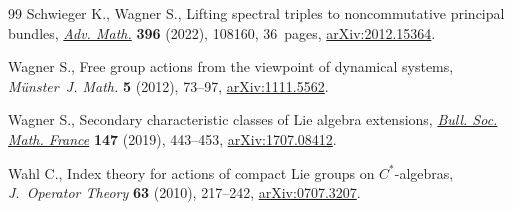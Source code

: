 \documentclass[10pt,a4paper]{amsart}
\numberwithin{equation}{section}
\begin{document}
\begin{thebibliography}{99}
Schwieger K., Wagner S., Lifting spectral triples to noncommutative principal
 bundles, \href{https://doi.org/10.1016/j.aim.2021.108160}{\textit{Adv. Math.}} \textbf{396} (2022), 108160, 36~pages,
 \href{https://arxiv.org/abs/2012.15364}{arXiv:2012.15364}.

Wagner S., Free group actions from the viewpoint of dynamical systems,
 \textit{M\"unster~J. Math.} \textbf{5} (2012), 73--97, \href{https://arxiv.org/abs/1111.5562}{arXiv:1111.5562}.

Wagner S., Secondary characteristic classes of {L}ie algebra extensions,
 \href{https://doi.org/10.24033/bsmf.278}{\textit{Bull. Soc. Math. France}} \textbf{147} (2019), 443--453,
 \href{https://arxiv.org/abs/1707.08412}{arXiv:1707.08412}.

Wahl C., Index theory for actions of compact {L}ie groups on {$C^*$}-algebras,
 \textit{J.~Operator Theory} \textbf{63} (2010), 217--242, \href{https://arxiv.org/abs/0707.3207}{arXiv:0707.3207}.

\end{thebibliography}
\end{document}
